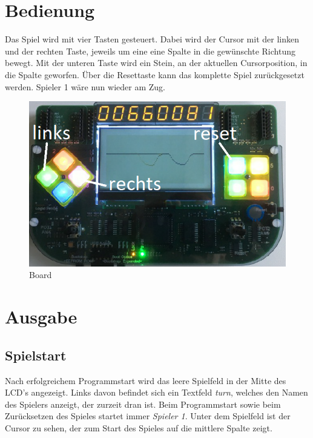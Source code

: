 \section{Bedienung}
    Das Spiel wird mit vier Tasten gesteuert.
    Dabei wird der Cursor mit der linken und der rechten Taste, jeweils um eine eine Spalte in die gewünschte Richtung bewegt.
    Mit der unteren Taste wird ein Stein, an der aktuellen Cursorposition, in die Spalte geworfen.
    Über die Resettaste kann das komplette Spiel zurückgesetzt werden. Spieler 1 wäre nun wieder am Zug.
    \begin{figure}[H]
        \centering
        \includegraphics[scale=0.5]{img/board.png}    
        \caption{Board}
        \label{fig:board}
    \end{figure}

\section{Ausgabe}
    \subsection{Spielstart}
        Nach erfolgreichem Programmstart wird das leere Spielfeld in der Mitte des LCD's angezeigt.
        Links davon befindet sich ein Textfeld \textit{turn}, welches den Namen des Spielers anzeigt, der zurzeit dran ist.
        Beim Programmstart sowie beim Zurücksetzen des Spieles startet immer \textit{Spieler 1}.
        Unter dem Spielfeld ist der Cursor zu sehen, der zum Start des Spieles auf die mittlere Spalte zeigt.

